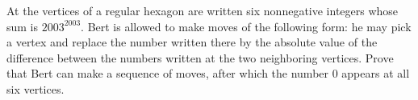 At the vertices of a regular hexagon are written six nonnegative integers whose sum is $2003^{2003}$. Bert is allowed to make moves of the following form: he may pick a vertex and replace the number written there by the absolute value of the difference between the numbers written at the two neighboring vertices. Prove that Bert can make a sequence of moves, after which the number 0 appears at all six vertices.